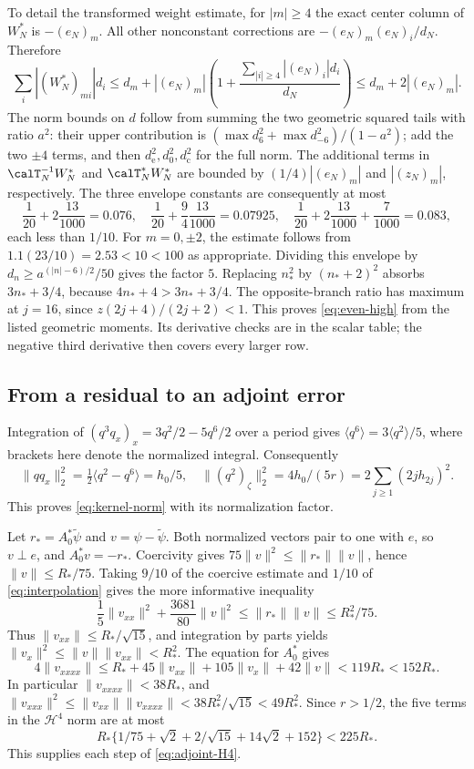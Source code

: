To detail the transformed weight estimate, for $|m|\ge4$ the exact center
column of $W_N^*$ is $-(e_N)_m$. All other nonconstant corrections are
$-(e_N)_m(e_N)_i/d_N$. Therefore
\[
 \sum_i|(W_N^*)_{mi}|d_i
 \le d_m+|(e_N)_m|
       \left(1+\frac{\sum_{|i|\ge4}|(e_N)_i|d_i}{d_N}\right)
 \le d_m+2|(e_N)_m|.
\]
The norm bounds on $d$ follow from summing the two geometric squared tails
with ratio $a^2$: their upper contribution is
$(\max d_6^2+\max d_{-6}^2)/(1-a^2)$; add the two $\pm4$ terms, and
then $d_{\mathrm e}^2,d_0^2,d_{\mathrm c}^2$ for the full norm.
The additional terms in $\calT_N^{-1}W_N^*$ and
$\calT_N^*W_N^*$ are bounded by
$(1/4)|(e_N)_m|$ and $|(z_N)_m|$, respectively. The three envelope constants
are consequently at most
\[
 \frac1{20}+2\frac{13}{1000}=0.076,\quad
 \frac1{20}+\frac94\frac{13}{1000}=0.07925,\quad
 \frac1{20}+2\frac{13}{1000}+\frac7{1000}=0.083,
\]
each less than $1/10$. For $m=0,\pm2$, the estimate follows from
$1.1(23/10)=2.53<10<100$ as appropriate.
Dividing this envelope by $d_n\ge a^{(|n|-6)/2}/50$ gives the factor $5$.
Replacing $n_*^2$ by $(n_*+2)^2$ absorbs $3n_*+3/4$, because
$4n_*+4>3n_*+3/4$. The opposite-branch ratio has maximum at $j=16$,
since $z(2j+4)/(2j+2)<1$. This proves \eqref{eq:even-high} from the
listed geometric moments. Its derivative checks are in the scalar table;
the negative third derivative then covers every larger row.

\subsection{From a residual to an adjoint error}
Integration of $(q^3q_x)_x=3q^2/2-5q^6/2$ over a period gives
$\langle q^6\rangle=3\langle q^2\rangle/5$, where brackets here denote
the normalized integral. Consequently
\[
 \|qq_x\|_2^2=\tfrac12\langle q^2-q^6\rangle=h_0/5,
 \quad \|(q^2)_\zeta\|_2^2=4h_0/(5r)
       =2\sum_{j\ge1}(2jh_{2j})^2.
\]
This proves \eqref{eq:kernel-norm} with its normalization factor.

Let $r_*=A_0^*\widetilde\psi$ and $v=\psi-\widetilde\psi$.
Both normalized vectors pair to one with $e$, so $v\perp e$, and
$A_0^*v=-r_*$. Coercivity gives
$75\|v\|^2\le\|r_*\|\|v\|$, hence $\|v\|\le R_*/75$.
Taking $9/10$ of the coercive estimate and $1/10$ of
\eqref{eq:interpolation} gives the more informative inequality
\[
 \frac15\|v_{xx}\|^2+\frac{3681}{80}\|v\|^2
 \le\|r_*\|\|v\|\le R_*^2/75.
\]
Thus $\|v_{xx}\|\le R_*/\sqrt{15}$, and integration by parts yields
$\|v_x\|^2\le\|v\|\|v_{xx}\|<R_*^2$. The equation for $A_0^*$ gives
\[
 4\|v_{xxxx}\|
 \le R_*+45\|v_{xx}\|+105\|v_x\|+42\|v\|
 <119R_*<152R_*.
\]
In particular $\|v_{xxxx}\|<38R_*$, and
$\|v_{xxx}\|^2\le\|v_{xx}\|\|v_{xxxx}\|
 <38R_*^2/\sqrt{15}<49R_*^2$.
Since $r>1/2$, the five terms in the $\mathcal H^4$ norm are at most
\[
 R_*\{1/75+\sqrt2+2/\sqrt{15}+14\sqrt2+152\}<225R_*.
\]
This supplies each step of \eqref{eq:adjoint-H4}.


